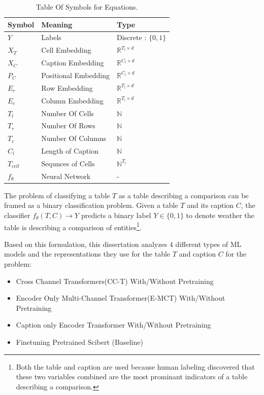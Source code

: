 \begin{table}
    \label{table\arabic{tablecounter}}
    \centering
    \begin{tabular}{|l|l|l|}
        \hline
        Symbol & Meaning & Type \\ \hline
        $Y$ & Labels & Discrete : $\{0,1\}$ \\ \hline
        $X_T$ & Cell Embedding & $\mathbb{R}^{T_l \times d}$\\ \hline
        $X_C$ & Caption Embedding & $\mathbb{R}^{C_l \times d}$ \\ \hline
        $P_C$ & Positional Embedding & $\mathbb{R}^{C_l \times d}$ \\ \hline
        $E_r$ & Row Embedding & $\mathbb{R}^{T_l \times d}$ \\ \hline
        $E_c$ & Column Embedding & $\mathbb{R}^{T_l \times d}$ \\ \hline
        $T_l$ & Number Of Cells & $\mathbb{N}$ \\ \hline
        $T_r$ & Number Of Rows & $\mathbb{N}$ \\ \hline
        $T_c$ & Number Of Columns & $\mathbb{N}$ \\ \hline
        $C_l$ & Length of Caption & $\mathbb{N}$ \\ \hline
        $T_{cell}$ & Sequnces of Cells & $\mathbb{N}^{T_l}$ \\ \hline
        $f_\theta$ & Neural Network & - \\ \hline
    \end{tabular}
    \caption{\label{tablecounter} Table Of Symbols for Equations. }
\end{table}
The problem of classifying a table $T$ as a table describing a comparison can be framed as a binary classification problem. Given a table $T$ and its caption $C$, the classifier $f_\theta(T,C) \rightarrow Y$ predicts a binary label $Y \in \{0,1\}$ to denote weather the table is describing a comparison of entities\footnote{Both the table and caption are used because human labeling discovered that these two variables combined are the most prominant indicators of a table describing a comparison.}. 

Based on this formulation, this dissertation analyzes 4 different types of ML models and the representations they use for the table $T$ and caption $C$ for the problem:
\begin{itemize}
    \item Cross Channel Transformers(CC-T) With/Without Pretraining
    \item Encoder Only Multi-Channel Transformer(E-MCT) With/Without Pretraining
    \item Caption only Encoder Transformer With/Without Pretraining 
    \item Finetuning Pretrained Scibert (Baseline)
\end{itemize}

